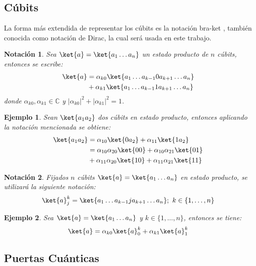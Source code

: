 \documentclass[10pt,conference,a4paper]{IEEEtran}
\newtheorem{notacion}{Notación}[subsection]
\newtheorem{ejemplo}{Ejemplo}
\providecommand{\abs}[1]{\lvert#1\rvert}
\begin{document}
\subsection{Cúbits}
La forma más extendida de representar los cúbits es la notación bra-ket \cite{Dirac_notation}, también conocida como notación de Dirac, la cual será usada en este trabajo.
\begin{notacion}
    Sea $\ket{a}=\ket{a_1\ldots a_n}$ un estado producto de $n$ cúbits, entonces se escribe:
    \begin{align}
    \begin{split}
                \ket{a}&=\alpha_{k0}\ket{a_1\ldots a_{k-1}0a_{k+1}\ldots a_n}\\
                &+\alpha_{k1}\ket{a_1\ldots a_{k-1}1a_{k+1}\ldots a_n}
    \end{split}
    \end{align}
    donde $\alpha_{k0}, \alpha_{k1}\in\mathbb{C}$ y $\abs{\alpha_{k0}}^2+\abs{\alpha_{k1}}^2=1$.
    \label{not:1}
\end{notacion}

\begin{ejemplo}
    Sean $\ket{a_1a_2}$ dos cúbits en estado producto, entonces aplicando la notación mencionada se obtiene:
    \begin{align*}
        \ket{a_1a_2}&=\alpha_{10}\ket{0a_2}+\alpha_{11}\ket{1a_2}\\
        &=\alpha_{10}\alpha_{20}\ket{00}+\alpha_{10}\alpha_{21}\ket{01}\\
        &+\alpha_{11}\alpha_{20}\ket{10}+\alpha_{11}\alpha_{21}\ket{11}
    \end{align*}
\end{ejemplo}

\begin{notacion}
    Fijados $n$ cúbits $\ket{a}=\ket{a_1\ldots a_n}$ en estado producto, se utilizará la siguiente notación:
    \begin{equation}
        \ket{a}_j^k=\ket{a_1\ldots a_{k-1}ja_{k+1}\ldots a_n};\ k\in\{1,\ldots, n\}
        \label{not:2}
    \end{equation}
\end{notacion}

\begin{ejemplo}
    Sea $\ket{a}=\ket{a_1\ldots a_n}$ y $k\in\{1,\ldots,n\}$, entonces se tiene:
    $$\ket{a}=\alpha_{k0}\ket{a}_0^k+\alpha_{k1}\ket{a}_1^k$$
\end{ejemplo}


\subsection{Puertas Cuánticas}
\end{document}
